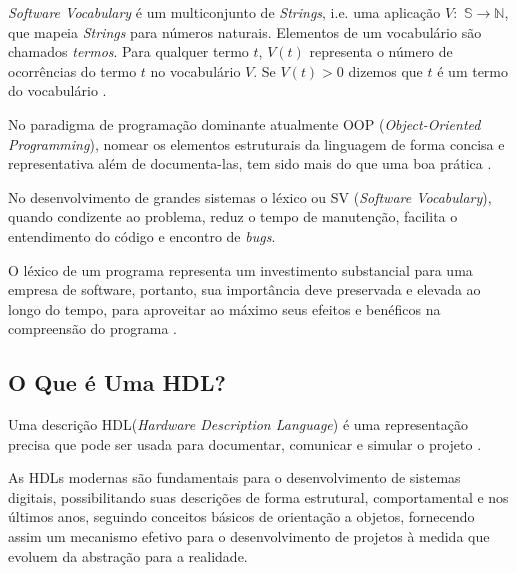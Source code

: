 \documentclass[12pt, twocolumn, a4paper]{article}
\begin{document}
 \textit{Software Vocabulary} é um multiconjunto de \textit{Strings}, i.e. uma aplicação $V:$ $\mathbb{S}\rightarrow\mathbb{N}$, que mapeia \textit{Strings} para números naturais. Elementos de um vocabulário são chamados \textit{termos}. Para qualquer termo $t$, $V(t)$ representa o número de ocorrências do termo $t$ no vocabulário $V$. Se $V(t)>0$ dizemos que $t$ é um termo do vocabulário \cite{Santos2015}.


No paradigma de programação dominante atualmente OOP (\textit{Object-Oriented Programming}), nomear os elementos estruturais da linguagem de forma concisa e representativa além de documenta-las, tem sido mais do que uma boa prática .

 No desenvolvimento de grandes sistemas o léxico ou SV (\textit{Software Vocabulary}), quando condizente ao problema, reduz o tempo de manutenção, facilita o entendimento do código e encontro de \textit{bugs}. 

O léxico de um programa representa um investimento substancial para uma empresa de software, portanto, sua importância deve preservada e elevada ao longo do tempo, para aproveitar ao máximo seus efeitos e benéficos na compreensão do programa \cite{Antoniol2007}.

	\subsection{O Que é Uma HDL?}

\quad Uma descrição HDL(\textit{Hardware Description Language}) é uma representação precisa que pode ser usada para documentar, comunicar e simular o projeto \cite{Miller-Karlow}.

As HDLs modernas são fundamentais para o desenvolvimento de sistemas digitais, possibilitando suas descrições de forma estrutural, comportamental e nos últimos anos, seguindo conceitos básicos de orientação a objetos, fornecendo assim um mecanismo efetivo para o desenvolvimento de projetos à medida que evoluem da abstração para a realidade.
\end{document}

